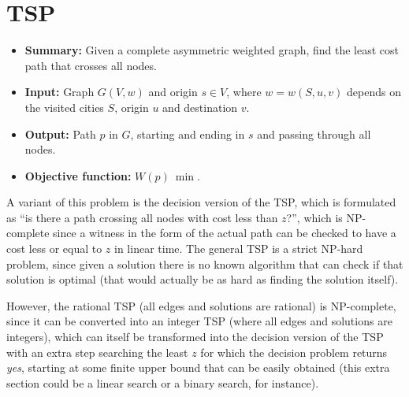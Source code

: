 \section{\texorpdfstring{\Acrlong*{TSP}}{Travelling salesman problem}} \label{algorithm-tsp}
\begin{itemize}
    \item \textbf{Summary:} Given a complete asymmetric weighted graph, find the least cost path that crosses all nodes. 
    \item \textbf{Input:} Graph $G(V,w)$ and origin $s \in V$, where $w=w(S, u, v)$ depends on the visited cities $S$, origin $u$ and destination $v$.
    \item \textbf{Output:} Path $p$ in $G$, starting and ending in $s$ and passing through all nodes.
    \item \textbf{Objective function:} $W(p)~\min$.
\end{itemize}
A variant of this problem is the decision version of the \acrshort*{TSP}, which is formulated as ``is there a path crossing all nodes with cost less than $z$?'', which is NP-complete since a witness in the form of the actual path can be checked to have a cost less or equal to $z$ in linear time.
The general \acrshort*{TSP} is a strict NP-hard problem, since given a solution there is no known algorithm that can check if that solution is optimal (that would actually be as hard as finding the solution itself).\par
However, the rational \acrshort*{TSP} (all edges and solutions are rational) is NP-complete, since it can be converted into an integer \acrshort*{TSP} (where all edges and solutions are integers), which can itself be transformed into the decision version of the \acrshort*{TSP} with an extra step searching the least $z$ for which the decision problem returns \emph{yes}, starting at some finite upper bound that can be easily obtained (this extra section could be a linear search or a binary search, for instance).


